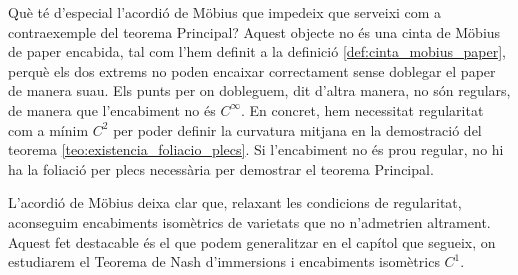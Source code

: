 Què té d'especial l'acordió de Möbius que impedeix que serveixi com a contraexemple del teorema Principal? Aquest objecte no és una cinta de Möbius de paper encabida, tal com l'hem definit a la definició \ref{def:cinta_mobius_paper}, perquè els dos extrems no poden encaixar correctament sense doblegar el paper de manera suau. Els punts per on dobleguem, dit d'altra manera, no són regulars, de manera que l'encabiment no és $C^\infty$. En concret, hem necessitat regularitat com a mínim $C^2$ per poder definir la curvatura mitjana en la demostració del teorema \ref{teo:existencia_foliacio_plecs}. Si l'encabiment no és prou regular, no hi ha la foliació per plecs necessària per demostrar el teorema Principal. 

L'acordió de Möbius deixa clar que, relaxant les condicions de regularitat, aconseguim encabiments isomètrics de varietats que no n'admetrien altrament. Aquest fet destacable és el que podem generalitzar en el capítol que segueix, on estudiarem el Teorema de Nash d'immersions i encabiments isomètrics $C^1$.

\newpage